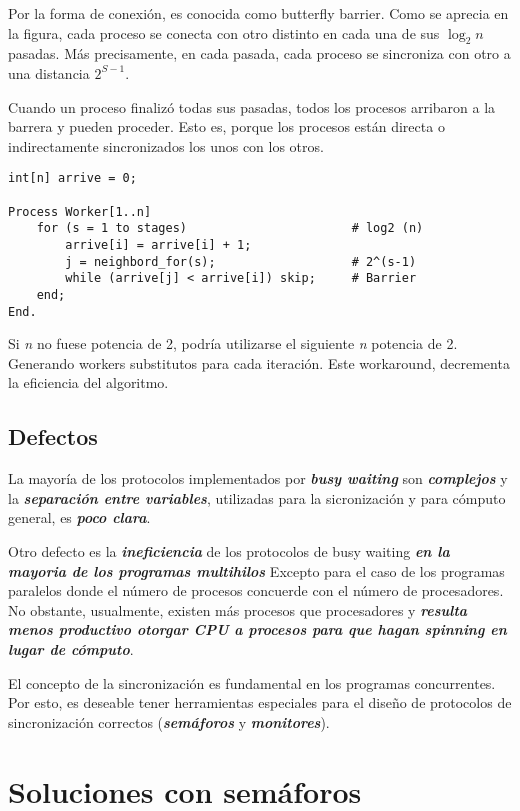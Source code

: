 \documentclass[a4paper, 11pt]{book}
\begin{document}
Por la forma de conexión, es conocida como butterfly barrier. Como se aprecia en la figura, cada proceso se conecta con otro distinto en cada una de sus $\log_2n$ pasadas. Más precisamente, en cada pasada, cada proceso se sincroniza con otro a una distancia $2^{S-1}$.

Cuando un proceso finalizó todas sus pasadas, todos los procesos arribaron a la barrera y pueden proceder. Esto es, porque los procesos están directa o indirectamente sincronizados los unos con los otros.

\begin{lstlisting}
int[n] arrive = 0;

Process Worker[1..n]
    for (s = 1 to stages)                       # log2 (n)
        arrive[i] = arrive[i] + 1;
        j = neighbord_for(s);                   # 2^(s-1)
        while (arrive[j] < arrive[i]) skip;     # Barrier
    end;
End.
\end{lstlisting}

Si \emph{n} no fuese potencia de 2, podría utilizarse el siguiente \emph{n} potencia de 2. Generando workers substitutos para cada iteración. Este workaround, decrementa la eficiencia del algoritmo.

\section{Defectos}

La mayoría de los protocolos implementados por \textbf{\emph{busy waiting}} son \textbf{\emph{complejos}} y la \textbf{\emph{separación entre variables}}, utilizadas para la sicronización y para cómputo general, es \textbf{\emph{poco clara}}.

Otro defecto es la \textbf{\emph{ineficiencia}} de los protocolos de busy waiting \textbf{\emph{en la mayoria de los programas multihilos}} Excepto para el caso de los programas paralelos donde el número de procesos concuerde con el número de procesadores. No obstante, usualmente, existen más procesos que procesadores y \textbf{\emph{resulta menos productivo otorgar CPU a procesos para que hagan spinning en lugar de cómputo}}.

El concepto de la sincronización es fundamental en los programas concurrentes. Por esto, es deseable tener herramientas especiales para el diseño de protocolos de sincronización correctos (\textbf{\emph{semáforos}} y \textbf{\emph{monitores}}).

\chapter{Soluciones con semáforos}
\end{document}
